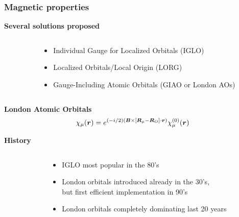 \begin{frame}
    \frametitle{Magnetic properties}
    \centering
    \textbf{Several solutions proposed}

    \begin{columns}
    \begin{column}[b]{0.1\linewidth}
    \end{column}
    \begin{column}[b]{0.9\linewidth}
    \begin{itemize}
        \item   Individual Gauge for Localized Orbitals (IGLO)
        \item   Localized Orbitals/Local Origin (LORG)
        \item   Gauge-Including Atomic Orbitals (GIAO or London AOs)
    \end{itemize}
    \end{column}
    \end{columns}

    \vspace{5mm}

    \textbf{London Atomic Orbitals}
    \begin{equation}
        \nonumber
        \chi_\mu(\boldsymbol r) =
        e^{(-i/2)(\boldsymbol B\times[\boldsymbol R_\mu-\boldsymbol R_O]\cdot\boldsymbol r)}\chi_\mu^{(0)}(\boldsymbol r)
    \end{equation}

    \vspace{5mm}

    \pause
    \textbf{History}
    \begin{columns}
    \begin{column}[b]{0.1\linewidth}
    \end{column}
    \begin{column}[b]{0.9\linewidth}
    \begin{itemize}
        \item   IGLO most popular in the 80's
        \item   London orbitals introduced already in the 30's,\\
                but first efficient implementation in 90's
        \item   London orbitals completely dominating last 20 years
    \end{itemize}
    \end{column}
    \end{columns}
\end{frame}

